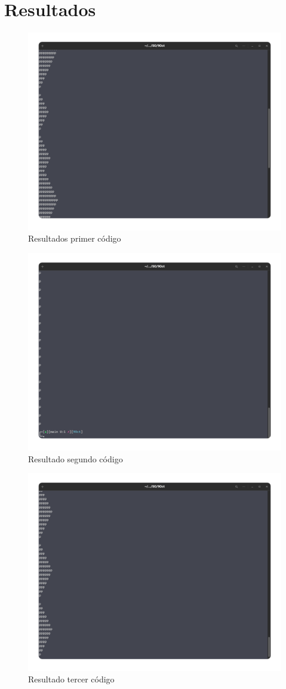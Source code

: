 \documentclass[10pt]{article}
\begin{document}
	\section{Resultados}
	\begin{figure}[h!]
		\centering
		\includegraphics[width=0.7\linewidth]{res1}
		\caption{Resultados primer código}
		\label{fig:res1}
	\end{figure}
	\begin{figure}[h!]
		\centering
		\includegraphics[width=0.7\linewidth]{res2}
		\caption{Resultado segundo código}
		\label{fig:res2}
	\end{figure}
	\begin{figure}[h!]
		\centering
		\includegraphics[width=0.7\linewidth]{res3}
		\caption{Resultado tercer código}
		\label{fig:res3}
	\end{figure}
	\newpage
\end{document}
